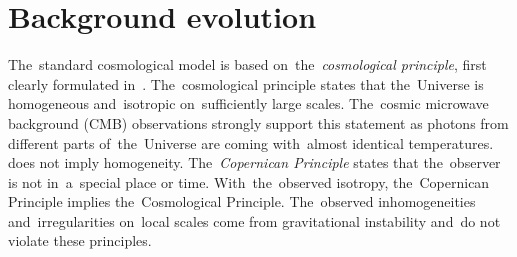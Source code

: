\section{Background evolution}
The~standard cosmological model is based on~the~\textit{cosmological principle}, first clearly formulated in~\textcite{1687pnpm.book.....N}. The~cosmological principle states that the~Universe is homogeneous and~isotropic on~sufficiently large scales\DIFdelbegin {}\DIFdelend . The~cosmic microwave background (CMB) observations strongly support this statement as photons from different parts of~the~Universe are coming with~almost identical temperatures. \DIFdelbegin {}\DIFdelend \DIFaddbegin {}\DIFaddend does not imply homogeneity. The~\textit{Copernican Principle} states that the~observer is not in~a~special place or time. With~the~observed isotropy, the~Copernican Principle implies the~Cosmological Principle. The~observed inhomogeneities and~irregularities on~local scales come from gravitational instability and~do not violate these principles.
